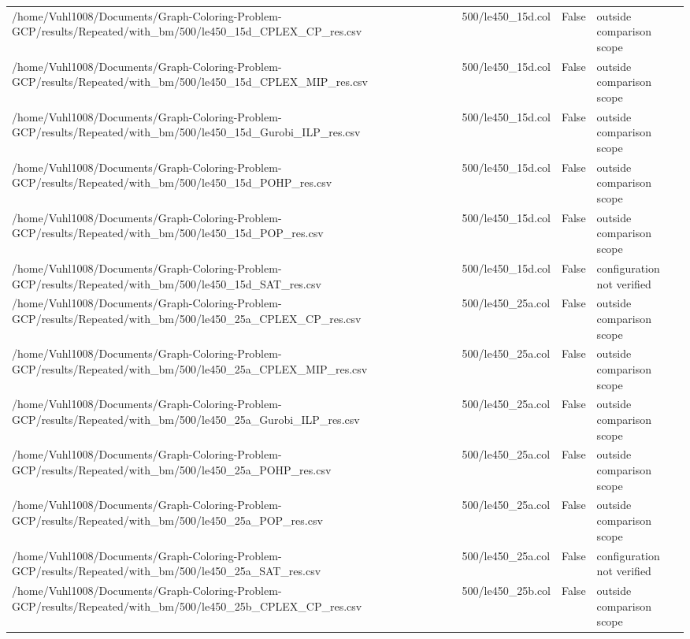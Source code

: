 \begin{table}[htbp]
\begin{tabular}{llll}
/home/Vuhl1008/Documents/Graph-Coloring-Problem-GCP/results/Repeated/with\_bm/500/le450\_15d\_CPLEX\_CP\_res.csv & 500/le450\_15d.col & False & outside comparison scope \\
/home/Vuhl1008/Documents/Graph-Coloring-Problem-GCP/results/Repeated/with\_bm/500/le450\_15d\_CPLEX\_MIP\_res.csv & 500/le450\_15d.col & False & outside comparison scope \\
/home/Vuhl1008/Documents/Graph-Coloring-Problem-GCP/results/Repeated/with\_bm/500/le450\_15d\_Gurobi\_ILP\_res.csv & 500/le450\_15d.col & False & outside comparison scope \\
/home/Vuhl1008/Documents/Graph-Coloring-Problem-GCP/results/Repeated/with\_bm/500/le450\_15d\_POHP\_res.csv & 500/le450\_15d.col & False & outside comparison scope \\
/home/Vuhl1008/Documents/Graph-Coloring-Problem-GCP/results/Repeated/with\_bm/500/le450\_15d\_POP\_res.csv & 500/le450\_15d.col & False & outside comparison scope \\
/home/Vuhl1008/Documents/Graph-Coloring-Problem-GCP/results/Repeated/with\_bm/500/le450\_15d\_SAT\_res.csv & 500/le450\_15d.col & False & configuration not verified \\
/home/Vuhl1008/Documents/Graph-Coloring-Problem-GCP/results/Repeated/with\_bm/500/le450\_25a\_CPLEX\_CP\_res.csv & 500/le450\_25a.col & False & outside comparison scope \\
/home/Vuhl1008/Documents/Graph-Coloring-Problem-GCP/results/Repeated/with\_bm/500/le450\_25a\_CPLEX\_MIP\_res.csv & 500/le450\_25a.col & False & outside comparison scope \\
/home/Vuhl1008/Documents/Graph-Coloring-Problem-GCP/results/Repeated/with\_bm/500/le450\_25a\_Gurobi\_ILP\_res.csv & 500/le450\_25a.col & False & outside comparison scope \\
/home/Vuhl1008/Documents/Graph-Coloring-Problem-GCP/results/Repeated/with\_bm/500/le450\_25a\_POHP\_res.csv & 500/le450\_25a.col & False & outside comparison scope \\
/home/Vuhl1008/Documents/Graph-Coloring-Problem-GCP/results/Repeated/with\_bm/500/le450\_25a\_POP\_res.csv & 500/le450\_25a.col & False & outside comparison scope \\
/home/Vuhl1008/Documents/Graph-Coloring-Problem-GCP/results/Repeated/with\_bm/500/le450\_25a\_SAT\_res.csv & 500/le450\_25a.col & False & configuration not verified \\
/home/Vuhl1008/Documents/Graph-Coloring-Problem-GCP/results/Repeated/with\_bm/500/le450\_25b\_CPLEX\_CP\_res.csv & 500/le450\_25b.col & False & outside comparison scope \\

\end{tabular}
\end{table}
